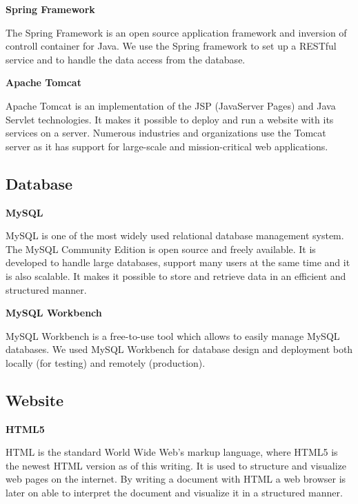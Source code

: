 \textbf{Spring Framework} \nocite{SpringFramework1}\nocite{SpringFramework2}

The Spring Framework is an open source application framework and inversion of controll container for Java. 
We use the Spring framework to set up a RESTful service and to handle the data access from the database. 

\textbf{Apache Tomcat} \nocite{ApacheTomcat}

Apache Tomcat is an implementation of the JSP (JavaServer Pages) and Java Servlet technologies.
It makes it possible to deploy and run a website with its services on a server.
Numerous industries and organizations use the Tomcat server as it has support for large-scale and mission-critical web applications.

\subsection{Database}

\textbf{MySQL} \nocite{MySQL}

MySQL is one of the most widely used relational database management system.
The MySQL Community Edition is open source and freely available.
It is developed to handle large databases, support many users at the same time and it is also scalable.
It makes it possible to store and retrieve data in an efficient and structured manner.

\textbf{MySQL Workbench}

MySQL Workbench is a free-to-use tool which allows to easily manage MySQL databases.
We used MySQL Workbench for database design and deployment both locally (for testing) and remotely (production).


\subsection{Website}

\textbf{HTML5} \nocite{HTML5}

HTML is the standard World Wide Web's markup language, where HTML5 is the newest HTML version as of this writing.
It is used to structure and visualize web pages on the internet.
By writing a document with HTML a web browser is later on able to interpret the document and visualize it in a structured manner.

